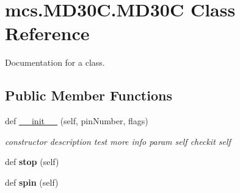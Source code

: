 \hypertarget{classmcs_1_1MD30C_1_1MD30C}{}\section{mcs.\+M\+D30\+C.\+M\+D30C Class Reference}
\label{classmcs_1_1MD30C_1_1MD30C}


Documentation for a class.  


\subsection*{Public Member Functions}
\begin{DoxyCompactItemize}
\item 
\mbox{\label{classmcs_1_1MD30C_1_1MD30C_a1b1ce8af448eed368286f98eeb4ed889}} 
def \hyperlink{classmcs_1_1MD30C_1_1MD30C_a1b1ce8af448eed368286f98eeb4ed889}{\+\_\+\+\_\+init\+\_\+\+\_\+} (self, pin\+Number, flags)
\begin{DoxyCompactList}\small\item\em constructor description test more info param self checkit self \end{DoxyCompactList}\item 
\mbox{\label{classmcs_1_1MD30C_1_1MD30C_a44edd8316747d97799f6ef5232c497e9}} 
def {\bfseries stop} (self)
\item 
\mbox{\label{classmcs_1_1MD30C_1_1MD30C_aef5ca804cda978ca52333a7cf6236e33}} 
def {\bfseries spin} (self)
\end{DoxyCompactItemize}
